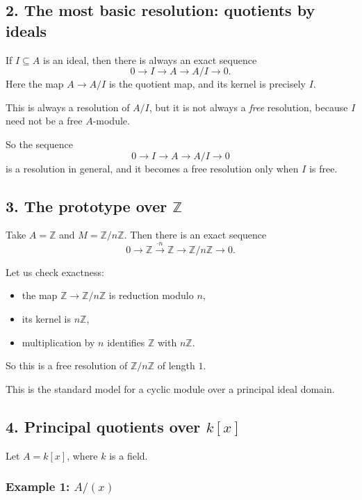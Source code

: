 \documentclass[12pt,a4paper]{article}
\theoremstyle{notespace}
\theoremstyle{definition}
\begin{document}
\subsection{2. The most basic resolution: quotients by ideals}

If \(I \subseteq A\) is an ideal, then there is always an exact sequence
\[
0 \longrightarrow I \longrightarrow A \longrightarrow A/I \longrightarrow 0.
\]
Here the map \(A \to A/I\) is the quotient map, and its kernel is precisely \(I\).

This is always a resolution of \(A/I\), but it is not always a \emph{free} resolution, because \(I\) need not be a free \(A\)-module.

So the sequence
\[
0 \longrightarrow I \longrightarrow A \longrightarrow A/I \longrightarrow 0
\]
is a resolution in general, and it becomes a free resolution only when \(I\) is free.

\subsection{3. The prototype over \(\mathbb Z\)}

Take \(A=\mathbb Z\) and \(M=\mathbb Z/n\mathbb Z\). Then there is an exact sequence
\[
0 \longrightarrow \mathbb Z \xrightarrow{\cdot n} \mathbb Z \longrightarrow \mathbb Z/n\mathbb Z \longrightarrow 0.
\]

Let us check exactness:
\begin{itemize}
	\item the map \(\mathbb Z \to \mathbb Z/n\mathbb Z\) is reduction modulo \(n\),
	\item its kernel is \(n\mathbb Z\),
	\item multiplication by \(n\) identifies \(\mathbb Z\) with \(n\mathbb Z\).
\end{itemize}

So this is a free resolution of \(\mathbb Z/n\mathbb Z\) of length \(1\).

This is the standard model for a cyclic module over a principal ideal domain.

\subsection{4. Principal quotients over \(k[x]\)}

Let \(A=k[x]\), where \(k\) is a field.

\subsubsection*{Example 1: \(A/(x)\)}
\end{document}
